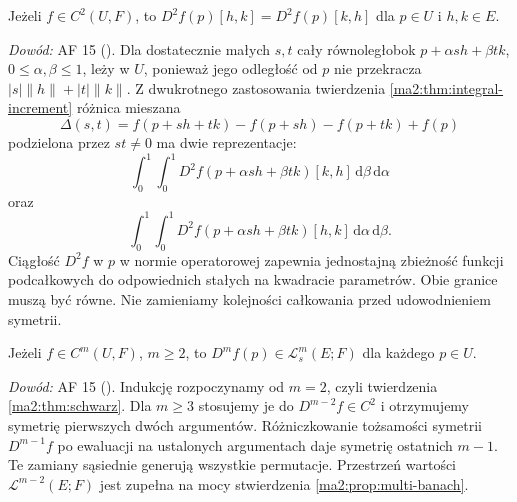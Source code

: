 \begin{twierdzenie}
\label{ma2:thm:schwarz}
Jeżeli $f\in C^2(U,F)$, to
$D^2f(p)[h,k]=D^2f(p)[k,h]$ dla $p\in U$ i $h,k\in E$.
\end{twierdzenie}

\emph{Dowód:} AF 15 ().
Dla dostatecznie małych $s,t$ cały równoległobok
$p+\alpha sh+\beta tk$, $0\le\alpha,\beta\le1$, leży w $U$,
ponieważ jego odległość od $p$ nie przekracza
$|s|\|h\|+|t|\|k\|$. Z dwukrotnego zastosowania
twierdzenia \ref{ma2:thm:integral-increment} różnica
mieszana
\[
 \Delta(s,t)=f(p+sh+tk)-f(p+sh)-f(p+tk)+f(p)
\]
podzielona przez $st\ne0$ ma dwie reprezentacje:
\[
 \int_0^1\int_0^1 D^2f(p+\alpha sh+\beta tk)[k,h]
       \,\mathrm d\beta\,\mathrm d\alpha
\]
oraz
\[
 \int_0^1\int_0^1 D^2f(p+\alpha sh+\beta tk)[h,k]
       \,\mathrm d\alpha\,\mathrm d\beta.
\]
Ciągłość $D^2f$ w $p$ w normie operatorowej
zapewnia jednostajną zbieżność funkcji podcałkowych
do odpowiednich stałych na kwadracie parametrów.
Obie granice muszą być równe. Nie zamieniamy
kolejności całkowania przed udowodnieniem symetrii.

\begin{wniosek}
\label{ma2:cor:higher-symmetric}
Jeżeli $f\in C^m(U,F)$, $m\ge2$, to
$D^mf(p)\in\mathcal L_s^m(E;F)$ dla każdego $p\in U$.
\end{wniosek}

\emph{Dowód:} AF 15 ().
Indukcję rozpoczynamy od $m=2$, czyli twierdzenia
\ref{ma2:thm:schwarz}. Dla $m\ge3$ stosujemy je
do $D^{m-2}f\in C^2$ i otrzymujemy symetrię
pierwszych dwóch argumentów.
Różniczkowanie tożsamości symetrii $D^{m-1}f$ po ewaluacji
na ustalonych argumentach daje symetrię ostatnich $m-1$.
Te zamiany sąsiednie generują wszystkie permutacje.
Przestrzeń wartości $\mathcal L^{m-2}(E;F)$ jest zupełna
na mocy stwierdzenia \ref{ma2:prop:multi-banach}.

